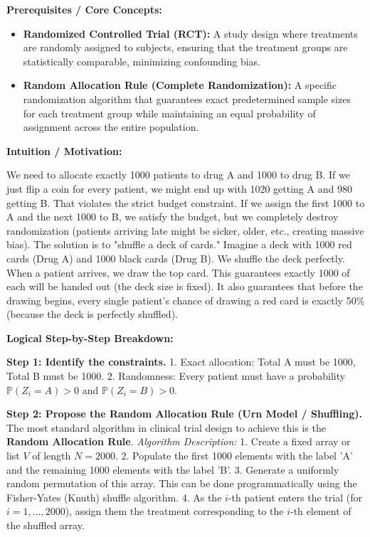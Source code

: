 \begin{solution}
\textbf{Prerequisites / Core Concepts:}
\begin{itemize}
    \item \textbf{Randomized Controlled Trial (RCT):} A study design where treatments are randomly assigned to subjects, ensuring that the treatment groups are statistically comparable, minimizing confounding bias.
    \item \textbf{Random Allocation Rule (Complete Randomization):} A specific randomization algorithm that guarantees exact predetermined sample sizes for each treatment group while maintaining an equal probability of assignment across the entire population.
\end{itemize}

\textbf{Intuition / Motivation:}

We need to allocate exactly 1000 patients to drug A and 1000 to drug B.
If we just flip a coin for every patient, we might end up with 1020 getting A and 980 getting B. That violates the strict budget constraint.
If we assign the first 1000 to A and the next 1000 to B, we satisfy the budget, but we completely destroy randomization (patients arriving late might be sicker, older, etc., creating massive bias).
The solution is to "shuffle a deck of cards." Imagine a deck with 1000 red cards (Drug A) and 1000 black cards (Drug B). We shuffle the deck perfectly. When a patient arrives, we draw the top card.
This guarantees exactly 1000 of each will be handed out (the deck size is fixed). It also guarantees that before the drawing begins, every single patient's chance of drawing a red card is exactly 50\% (because the deck is perfectly shuffled).

\textbf{Logical Step-by-Step Breakdown:}

\textbf{Step 1: Identify the constraints.}
1. Exact allocation: Total A must be 1000, Total B must be 1000.
2. Randomness: Every patient must have a probability $\mathbb{P}(Z_i = A) > 0$ and $\mathbb{P}(Z_i = B) > 0$.

\textbf{Step 2: Propose the Random Allocation Rule (Urn Model / Shuffling).}
The most standard algorithm in clinical trial design to achieve this is the \textbf{Random Allocation Rule}.
\textit{Algorithm Description:}
1. Create a fixed array or list $V$ of length $N = 2000$.
2. Populate the first 1000 elements with the label 'A' and the remaining 1000 elements with the label 'B'.
3. Generate a uniformly random permutation of this array. This can be done programmatically using the Fisher-Yates (Knuth) shuffle algorithm.
4. As the $i$-th patient enters the trial (for $i = 1, \dots, 2000$), assign them the treatment corresponding to the $i$-th element of the shuffled array.


\end{solution}
